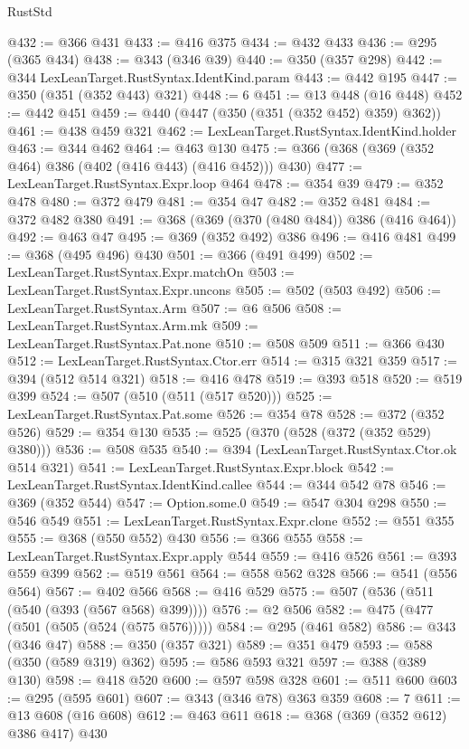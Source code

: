 \begin{lexlean}{RustStd}
\begin{coremodule}
@432 := @366 @431
@433 := @416 @375
@434 := @432 @433
@436 := @295 (@365 @434)
@438 := @343 (@346 @39)
@440 := @350 (@357 @298)
@442 := @344 LexLeanTarget.RustSyntax.IdentKind.param
@443 := @442 @195
@447 := @350 (@351 (@352 @443) @321)
@448 := 6
@451 := @13 @448 (@16 @448)
@452 := @442 @451
@459 := @440 (@447 (@350 (@351 (@352 @452) @359) @362))
@461 := @438 @459 @321
@462 := LexLeanTarget.RustSyntax.IdentKind.holder
@463 := @344 @462
@464 := @463 @130
@475 := @366 (@368 (@369 (@352 @464) @386 (@402 (@416 @443) (@416 @452))) @430)
@477 := LexLeanTarget.RustSyntax.Expr.loop @464
@478 := @354 @39
@479 := @352 @478
@480 := @372 @479
@481 := @354 @47
@482 := @352 @481
@484 := @372 @482 @380
@491 := @368 (@369 (@370 (@480 @484)) @386 (@416 @464))
@492 := @463 @47
@495 := @369 (@352 @492) @386
@496 := @416 @481
@499 := @368 (@495 @496) @430
@501 := @366 (@491 @499)
@502 := LexLeanTarget.RustSyntax.Expr.matchOn
@503 := LexLeanTarget.RustSyntax.Expr.uncons
@505 := @502 (@503 @492)
@506 := LexLeanTarget.RustSyntax.Arm
@507 := @6 @506
@508 := LexLeanTarget.RustSyntax.Arm.mk
@509 := LexLeanTarget.RustSyntax.Pat.none
@510 := @508 @509
@511 := @366 @430
@512 := LexLeanTarget.RustSyntax.Ctor.err
@514 := @315 @321 @359
@517 := @394 (@512 @514 @321)
@518 := @416 @478
@519 := @393 @518
@520 := @519 @399
@524 := @507 (@510 (@511 (@517 @520)))
@525 := LexLeanTarget.RustSyntax.Pat.some
@526 := @354 @78
@528 := @372 (@352 @526)
@529 := @354 @130
@535 := @525 (@370 (@528 (@372 (@352 @529) @380)))
@536 := @508 @535
@540 := @394 (LexLeanTarget.RustSyntax.Ctor.ok @514 @321)
@541 := LexLeanTarget.RustSyntax.Expr.block
@542 := LexLeanTarget.RustSyntax.IdentKind.callee
@544 := @344 @542 @78
@546 := @369 (@352 @544)
@547 := Option.some.{0}
@549 := @547 @304 @298
@550 := @546 @549
@551 := LexLeanTarget.RustSyntax.Expr.clone
@552 := @551 @355
@555 := @368 (@550 @552) @430
@556 := @366 @555
@558 := LexLeanTarget.RustSyntax.Expr.apply @544
@559 := @416 @526
@561 := @393 @559 @399
@562 := @519 @561
@564 := @558 @562 @328
@566 := @541 (@556 @564)
@567 := @402 @566
@568 := @416 @529
@575 := @507 (@536 (@511 (@540 (@393 (@567 @568) @399))))
@576 := @2 @506
@582 := @475 (@477 (@501 (@505 (@524 (@575 @576)))))
@584 := @295 (@461 @582)
@586 := @343 (@346 @47)
@588 := @350 (@357 @321)
@589 := @351 @479
@593 := @588 (@350 (@589 @319) @362)
@595 := @586 @593 @321
@597 := @388 (@389 @130)
@598 := @418 @520
@600 := @597 @598 @328
@601 := @511 @600
@603 := @295 (@595 @601)
@607 := @343 (@346 @78) @363 @359
@608 := 7
@611 := @13 @608 (@16 @608)
@612 := @463 @611
@618 := @368 (@369 (@352 @612) @386 @417) @430

\end{coremodule}
\end{lexlean}
